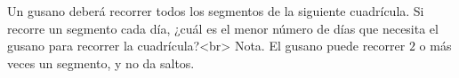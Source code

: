 Un gusano deberá recorrer todos los segmentos de la siguiente cuadrícula. Si recorre un segmento cada día, ¿cuál es el menor número de días que necesita el gusano para recorrer la cuadrícula?<br>
Nota. El gusano puede recorrer $2$ o más veces un segmento, y no da saltos.